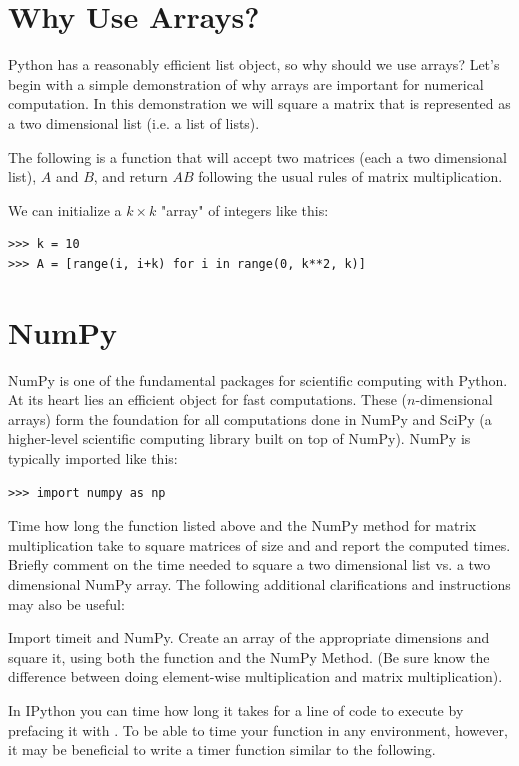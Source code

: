 \label{lab:NumPyArrays}

\section*{Why Use Arrays?} Python has a reasonably efficient list object, 
so why should we use arrays? Let's begin with a simple demonstration of why
arrays are important for numerical computation. In this demonstration 
we will square a matrix that is represented as a two dimensional list 
(i.e. a list of lists).

The following is a function that will accept two matrices (each a two
dimensional list), $A$ and $B$, and return $AB$ following the usual rules
of matrix multiplication. 



We can initialize a $k \times k$ "array" of integers like this:
\begin{lstlisting}
>>> k = 10 
>>> A = [range(i, i+k) for i in range(0, k**2, k)]
\end{lstlisting}

\section*{NumPy} NumPy is one of the fundamental packages for scientific
computing with Python. At its heart lies an efficient 
object for fast computations. These ($n$-dimensional arrays) form
the foundation for all computations done in NumPy and SciPy (a
higher-level scientific computing library built on top of NumPy). NumPy
is typically imported like this: 

\begin{lstlisting}
>>> import numpy as np
\end{lstlisting}

\begin{problem} 
Time how long the  function 
listed above and the NumPy method for matrix multiplication take to square matrices of size 
and  and report the computed times. Briefly comment on the time needed to 
square a two dimensional list vs. a two dimensional NumPy array. The following
additional clarifications and instructions may also be useful:

Import timeit and NumPy. Create an array of the appropriate dimensions and square it, 
using both the function and the NumPy Method. (Be sure know the difference
 between doing element-wise multiplication and matrix multiplication).

In IPython you can time how long it takes for a line of code to execute
by prefacing it with . To be able to time your function in any environment, however, 
it may be beneficial to write a timer function similar to the following.


\end{problem}

